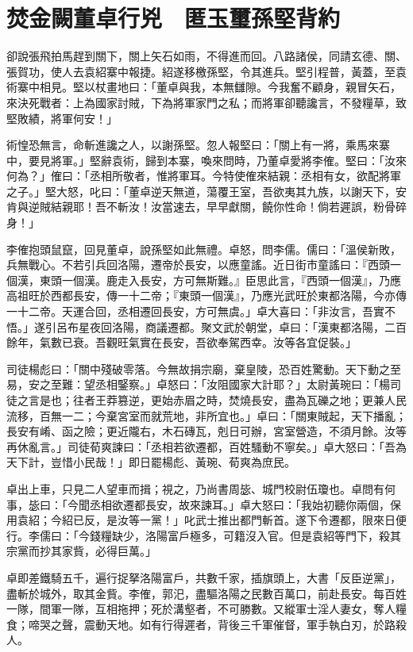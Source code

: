 
\chapter{焚金闕董卓行兇　匿玉璽孫堅背約}

卻說張飛拍馬趕到關下，關上矢石如雨，不得進而回。八路諸侯，同請玄德、關、張賀功，使人去袁紹寨中報捷。紹遂移檄孫堅，令其進兵。堅引程普，黃蓋，至袁術寨中相見。堅以杖畫地曰：「董卓與我，本無讎隙。今我奮不顧身，親冒矢石，來決死戰者：上為國家討賊，下為將軍家門之私；而將軍卻聽讒言，不發糧草，致堅敗績，將軍何安！」

術惶恐無言，命斬進讒之人，以謝孫堅。忽人報堅曰：「關上有一將，乘馬來寨中，要見將軍。」堅辭袁術，歸到本寨，喚來問時，乃董卓愛將李傕。堅曰：「汝來何為？」傕曰：「丞相所敬者，惟將軍耳。今特使傕來結親：丞相有女，欲配將軍之子。」堅大怒，叱曰：「董卓逆天無道，蕩覆王室，吾欲夷其九族，以謝天下，安肯與逆賊結親耶！吾不斬汝！汝當速去，早早獻關，饒你性命！倘若遲誤，粉骨碎身！」

李傕抱頭鼠竄，回見董卓，說孫堅如此無禮。卓怒，問李儒。儒曰：「溫侯新敗，兵無戰心。不若引兵回洛陽，遷帝於長安，以應童謠。近日街市童謠曰：『西頭一個漢，東頭一個漢。鹿走入長安，方可無斯難。』臣思此言，『西頭一個漢』，乃應高祖旺於西都長安，傳一十二帝；『東頭一個漢』，乃應光武旺於東都洛陽，今亦傳一十二帝。天運合回，丞相遷回長安，方可無虞。」卓大喜曰：「非汝言，吾實不悟。」遂引呂布星夜回洛陽，商議遷都。聚文武於朝堂，卓曰：「漢東都洛陽，二百餘年，氣數已衰。吾觀旺氣實在長安，吾欲奉駕西幸。汝等各宜促裝。」

司徒楊彪曰：「關中殘破零落。今無故捐宗廟，棄皇陵，恐百姓驚動。天下動之至易，安之至難：望丞相鋻察。」卓怒曰：「汝阻國家大計耶？」太尉黃琬曰：「楊司徒之言是也；往者王莽篡逆，更始赤眉之時，焚燒長安，盡為瓦礫之地；更兼人民流移，百無一二；今棄宮室而就荒地，非所宜也。」卓曰：「關東賊起，天下播亂；長安有崤、函之險；更近隴右，木石磚瓦，剋日可辦，宮室營造，不須月餘。汝等再休亂言。」司徒荀爽諫曰：「丞相若欲遷都，百姓騷動不寧矣。」卓大怒曰：「吾為天下計，豈惜小民哉！」即日罷楊彪、黃琬、荀爽為庶民。

卓出上車，只見二人望車而揖；視之，乃尚書周毖、城門校尉伍瓊也。卓問有何事，毖曰：「今聞丞相欲遷都長安，故來諫耳。」卓大怒曰：「我始初聽你兩個，保用袁紹；今紹已反，是汝等一黨！」叱武士推出都門斬首。遂下令遷都，限來日便行。李儒曰：「今錢糧缺少，洛陽富戶極多，可籍沒入官。但是袁紹等門下，殺其宗黨而抄其家貲，必得巨萬。」

卓即差鐵騎五千，遍行捉拏洛陽富戶，共數千家，插旗頭上，大書「反臣逆黨」，盡斬於城外，取其金貲。李傕，郭汜，盡驅洛陽之民數百萬口，前赴長安。每百姓一隊，間軍一隊，互相拖押；死於溝壑者，不可勝數。又縱軍士淫人妻女，奪人糧食；啼哭之聲，震動天地。如有行得遲者，背後三千軍催督，軍手執白刃，於路殺人。


